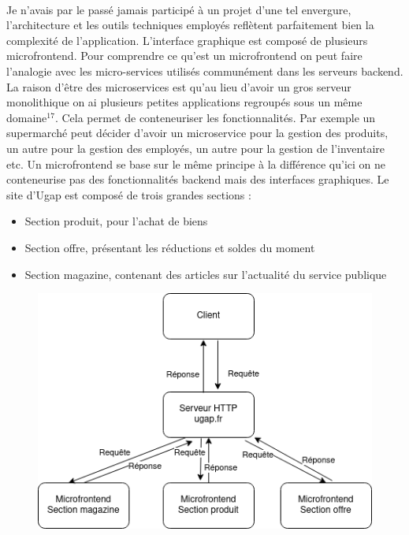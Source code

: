 \documentclass[12pt]{article}
\begin{document}
\begin {sloppypar}
\paragraph{}
Je n'avais par le passé jamais participé à un projet d'une tel envergure, l'architecture et les outils 
techniques employés reflètent parfaitement bien la complexité de l'application. L'interface graphique 
est composé de plusieurs microfrontend. Pour comprendre ce qu'est un microfrontend on peut faire 
l'analogie avec les micro-services utilisés communément dans les serveurs backend. La raison d'être 
des microservices est qu'au lieu d'avoir un gros serveur monolithique on ai plusieurs petites applications 
regroupés sous un même domaine$^{17}$. Cela permet de conteneuriser les fonctionnalités. Par exemple 
un supermarché peut décider d'avoir un microservice pour la gestion des produits, un autre pour la 
gestion des employés, un autre pour la gestion de l'inventaire etc. Un microfrontend se base sur le même 
principe à la différence qu'ici on ne conteneurise pas des fonctionnalités backend mais des interfaces 
graphiques.
\newpage
Le site d'Ugap est composé de trois grandes sections : 
\begin{itemize}
  \item 
    Section produit, pour l'achat de biens
  \item 
    Section offre, présentant les réductions et soldes du moment
  \item 
    Section magazine, contenant des articles sur l'actualité du service publique
\end{itemize}
\begin{figure}[h]
  \includegraphics[width=\textwidth] {archi_ugap.png}

\end{figure}
\end{sloppypar}
\end{document}
